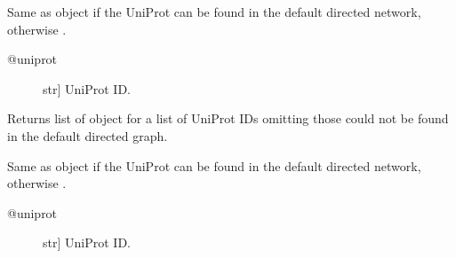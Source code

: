 \documentclass[letterpaper,10pt,english]{sphinxmanual}
\begin{document}
\begin{fulllineitems}

\begin{fulllineitems}
\label{\detokenize{reference:pypath.main.PyPath.dps}}
\end{fulllineitems}


\begin{fulllineitems}
\label{\detokenize{reference:pypath.main.PyPath.duniprot}}
Same as  object if the UniProt
can be found in the default directed network,
otherwise .
\begin{description}
\item[{@uniprot}] \leavevmode{[}str{]}
UniProt ID.

\end{description}

\end{fulllineitems}


\begin{fulllineitems}
\label{\detokenize{reference:pypath.main.PyPath.duniprots}}
Returns list of  object
for a list of UniProt IDs omitting those
could not be found in the default
directed graph.

\end{fulllineitems}


\begin{fulllineitems}
\label{\detokenize{reference:pypath.main.PyPath.dup}}
Same as  object if the UniProt
can be found in the default directed network,
otherwise .
\begin{description}
\item[{@uniprot}] \leavevmode{[}str{]}
UniProt ID.


\end{description}
\end{fulllineitems}
\end{fulllineitems}
\end{document}
